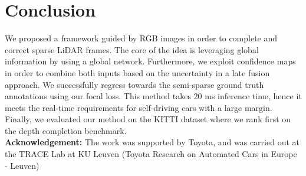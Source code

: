 \documentclass{main_style}
\begin{document}
\section{Conclusion}\label{conclusion}
We proposed a framework guided by RGB images in order to complete and correct sparse LiDAR frames. The core of the idea is leveraging global information by using a global network. Furthermore, we exploit confidence maps in order to combine both inputs based on the uncertainty in a late fusion approach. We successfully regress towards the semi-sparse ground truth annotations using our focal loss. This method takes 20 ms inference time, hence it meets the real-time requirements for self-driving cars with a large margin. Finally, we evaluated our method on the KITTI dataset where we rank first on the depth completion benchmark. \\
\textbf{Acknowledgement:}
The work was supported by Toyota, and
was  carried  out  at  the  TRACE  Lab  at  KU  Leuven  (Toyota
Research on Automated Cars in Europe - Leuven)


\balance
\end{document}
